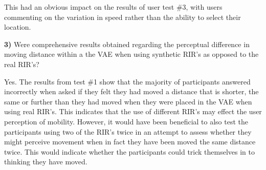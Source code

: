 \documentclass[../../main.tex]{subfiles}
\begin{document}

				 This had an obvious impact on the results of user test \#3, with users commenting on the variation in speed rather than the ability to select their location.

			\textbf{3)} Were comprehensive results obtained regarding the perceptual difference in moving distance within a the \ac{VAE} when using synthetic \ac{RIR}'s as opposed to the real \ac{RIR}'s?

				Yes. The results from test \#1 show that the majority of participants answered incorrectly when asked if they felt they had moved a distance that is shorter, the same or further than they had moved when they were placed in the \ac{VAE} when using real \ac{RIR}'s. This indicates that the use of different \ac{RIR}'s may effect the user perception of mobility. However, it would have been beneficial to also test the participants using two of the \ac{RIR}'s twice in an attempt to assess whether they might perceive movement when in fact they have been moved the same distance twice. This would indicate whether the participants could trick themselves in to thinking they have moved.%


\end{document}
